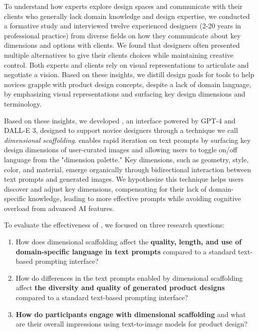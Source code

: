 To understand how experts explore design spaces and communicate with their clients who generally lack domain knowledge and design expertise, we conducted a formative study and interviewed twelve experienced designers (2-20 years in professional practice) from diverse fields on how they communicate about key dimensions and options with clients. We found that designers often presented multiple alternatives to give their clients choices while maintaining creative control. Both experts and clients rely on visual representations to articulate and negotiate a vision. Based on these insights, we distill design goals for tools to help novices grapple with product design concepts, despite a lack of domain language, by emphasizing visual representations and surfacing key design dimensions and terminology.

Based on these insights, we developed \toolname{}, an interface powered by GPT-4 and DALL-E 3, designed to support novice designers through a technique we call \textit{dimensional scaffolding}. \toolname{} enables rapid iteration on text prompts by surfacing key design dimensions of user-curated images and allowing users to toggle on/off language from the "dimension palette." Key dimensions, such as geometry, style, color, and material, emerge organically through bidirectional interaction between text prompts and generated images. We hypothesize this technique helps users discover and adjust key dimensions, compensating for their lack of domain-specific knowledge, leading to more effective prompts while avoiding cognitive overload from advanced AI features.

To evaluate the effectiveness of \textit{\toolname{}}, we focused on three research questions:

\begin{enumerate} 
    \item How does dimensional scaffolding affect the \textbf{quality, length, and use of domain-specific language in text prompts} compared to a standard text-based prompting interface?
    \item How do differences in the text prompts enabled by dimensional scaffolding affect \textbf{the diversity and quality of generated product designs} compared to a standard text-based prompting interface?
    \item \textbf{How do participants engage with dimensional scaffolding} and what are their overall impressions using text-to-image models for product design?
\end{enumerate}

